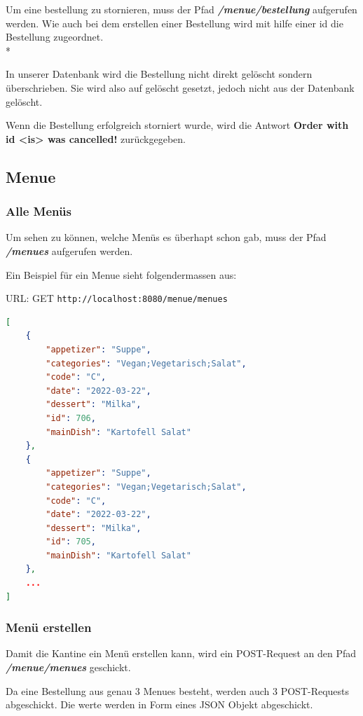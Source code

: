 Um eine bestellung zu stornieren, muss der Pfad \textbf{\textit{/menue/bestellung}} aufgerufen werden. Wie auch bei dem erstellen einer Bestellung wird 
mit hilfe einer id die Bestellung zugeordnet. \\*

In unserer Datenbank wird die Bestellung nicht direkt gelöscht sondern überschrieben. Sie wird also auf gelöscht gesetzt, jedoch nicht aus der Datenbank gelöscht.

Wenn die Bestellung erfolgreich storniert wurde, wird die Antwort \textbf{Order with id <is> was cancelled!} zurückgegeben.

\subsection{Menue}

\subsubsection{Alle Menüs}

Um sehen zu können, welche Menüs es überhapt schon gab, muss der Pfad \textbf{\textit{/menues}} aufgerufen werden. 

Ein Beispiel für ein Menue sieht folgendermassen aus:

URL: GET \colorbox{white}{\lstinline[basicstyle=\ttfamily\color{black},language=html]|http://localhost:8080/menue/menues|}


\begin{lstlisting}[language=json,firstnumber=1]
[
    {
        "appetizer": "Suppe",
        "categories": "Vegan;Vegetarisch;Salat",
        "code": "C",
        "date": "2022-03-22",
        "dessert": "Milka",
        "id": 706,
        "mainDish": "Kartofell Salat"
    },
    {
        "appetizer": "Suppe",
        "categories": "Vegan;Vegetarisch;Salat",
        "code": "C",
        "date": "2022-03-22",
        "dessert": "Milka",
        "id": 705,
        "mainDish": "Kartofell Salat"
    },
    ...
]
\end{lstlisting}

\subsubsection{Menü erstellen}

Damit die Kantine ein Menü erstellen kann, wird ein POST-Request an den Pfad \textbf{\textit{/menue/menues}} geschickt.

Da eine Bestellung aus genau 3 Menues besteht, werden auch 3 POST-Requests abgeschickt. Die werte werden in Form eines JSON Objekt abgeschickt.

